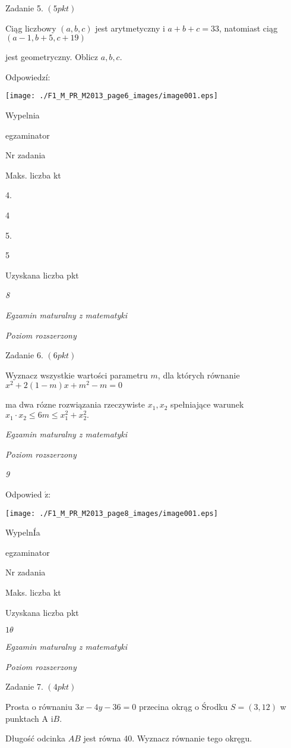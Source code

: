 \documentclass[a4paper,12pt]{article}
\begin{document}
Zadanie 5. $(5pkt)$

Ciąg liczbowy $(a,b,c)$ jest arytmetyczny i $a+b+c=33$, natomiast ciąg $(a-1,b+5,c+19)$

jest geometryczny. Oblicz $a, b, c.$

Odpowiedzí:
\begin{center}
\texttt{[image: ./F1\_M\_PR\_M2013\_page6\_images/image001.eps]}
\end{center}
Wypelnia

egzaminator

Nr zadania

Maks. liczba kt

4.

4

5.

5

Uzyskana liczba pkt





{\it 8}

{\it Egzamin maturalny z matematyki}

{\it Poziom rozszerzony}

Zadanie 6. $(6pkt)$

Wyznacz wszystkie wartości parametru $m$, dla których równanie $x^{2}+2(1-m)x+m^{2}-m=0$

ma dwa rózne rozwiązania rzeczywiste $x_{1}, x_{2}$ spełniające warunek $x_{1}\cdot x_{2}\leq 6m\leq x_{1}^{2}+x_{2}^{2}.$





{\it Egzamin maturalny z matematyki}

{\it Poziom rozszerzony}

{\it 9}

Odpowied $\acute{\mathrm{z}}$:
\begin{center}
\texttt{[image: ./F1\_M\_PR\_M2013\_page8\_images/image001.eps]}
\end{center}
WypelnÍa

egzaminator

Nr zadania

Maks. liczba kt

Uzyskana liczba pkt





$ 1\theta$

{\it Egzamin maturalny z matematyki}

{\it Poziom rozszerzony}

Zadanie 7. $(4pkt)$

Prosta o równaniu $3x-4y-36=0$ przecina okrąg o Środku $S=(3,12)$ w punktach A $\mathrm{i}B.$

Długość odcinka $AB$ jest równa 40. Wyznacz równanie tego okręgu.
\end{document}
